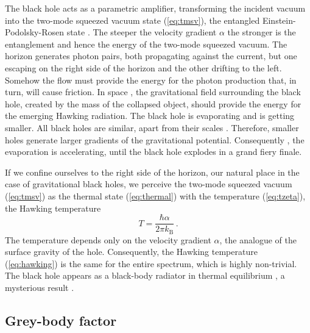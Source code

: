 \documentclass[12pt,amsmath,amssymb]{article}
\numberwithin{equation}{section}
\begin{document}
The black hole acts as a parametric amplifier, transforming
the incident vacuum into the two-mode squeezed vacuum
state (\ref{eq:tmsv}), the entangled Einstein-Podolsky-Rosen
state \cite{EPR}. The steeper the velocity gradient $\alpha$
the stronger is the entanglement and hence the energy of the
two-mode squeezed vacuum.
The horizon generates photon pairs,
both propagating against the current,
but one escaping on the right side of the horizon
and the other drifting to the left.
Somehow the flow must provide the energy for the
photon production that, in turn, will cause friction.
In space \cite{MTW},
the gravitational field surrounding the black hole,
created by the mass of the collapsed object,
should provide the energy for the emerging Hawking radiation.
The black hole is evaporating and is getting smaller.
All black holes are similar, apart from their scales \cite{MTW}.
Therefore, smaller holes generate larger gradients of the gravitational
potential. Consequently \cite{Hawking1},
the evaporation is accelerating,
until the black hole explodes in a grand fiery finale.

If we confine ourselves to the right side of the horizon, our
natural place in the case of gravitational black holes,
we perceive the two-mode squeezed vacuum (\ref{eq:tmsv})
as the thermal state (\ref{eq:thermal}) with the temperature
(\ref{eq:tzeta}), the Hawking temperature
\begin{equation}
\label{eq:hawking}
T = \frac{\hbar\alpha}{2\pi k_\mathrm{B}} \,.
\end{equation}
The temperature depends only on the velocity gradient $\alpha$,
the analogue of the surface gravity of the hole.
Consequently, the Hawking temperature (\ref{eq:hawking})
is the same for the entire spectrum, which is highly
non-trivial. The black hole appears as a black-body
radiator in thermal equilibrium
\cite{Bekenstein1,Bekenstein2,Brout,JP},
a mysterious result \cite{Hawking1}.

\subsection{Grey-body factor}
\end{document}
